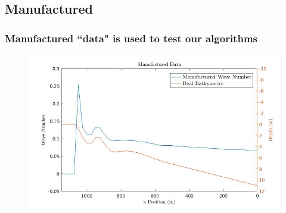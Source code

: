 \documentclass[7pt]{beamer}
\begin{document}
\subsection{Manufactured}

\begin{frame}
 	\frametitle{Manufactured ``data" is used to test our algorithms}
		\begin{figure}
			\includegraphics[width=1.0\linewidth]{img/Manufactured_data.jpg}
		\end{figure}
\end{frame}
\end{document}

